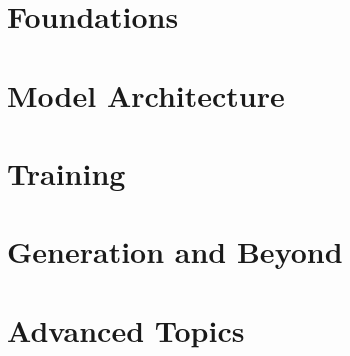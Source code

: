 \documentclass[11pt,a4paper,openany]{book}
\begin{document}
\part{Foundations}






\part{Model Architecture}






\part{Training}





\part{Generation and Beyond}




\part{Advanced Topics}
\end{document}
